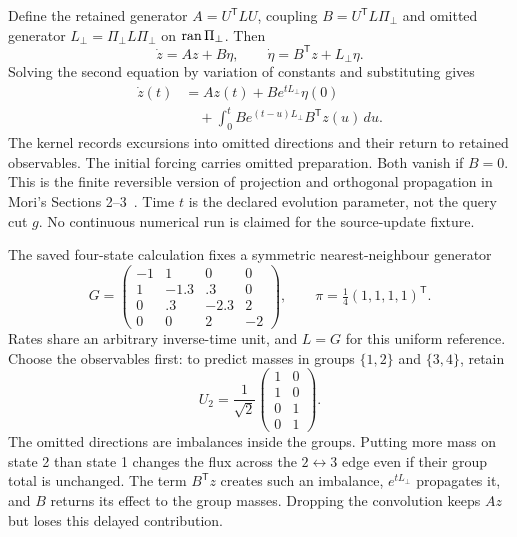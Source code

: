 Define the retained generator \(A=U^{\mathsf T}LU\), coupling \(B=U^{\mathsf T}L\Pi_\perp\) and omitted generator
\(L_\perp=\Pi_\perp L\Pi_\perp\) on \(\operatorname{ran}\Pi_\perp\).
Then
\begin{equation}
 \dot z=Az+B\eta,\qquad
 \dot\eta=B^{\mathsf T}z+L_\perp\eta .
\end{equation}
Solving the second equation by variation of constants and substituting gives
\begin{align}
 \dot z(t)&=Az(t)+B e^{tL_\perp}\eta(0)\nonumber\\
 &\quad+\int_0^t B e^{(t-u)L_\perp}B^{\mathsf T}z(u)\,du .
 \label{eq:dm-memory}
\end{align}
The kernel records excursions into omitted directions and their return to retained observables.
The initial forcing carries omitted preparation.
Both vanish if \(B=0\).
This is the finite reversible version of projection and orthogonal propagation in Mori's Sections 2--3~\cite{mori}.
Time \(t\) is the declared evolution parameter, not the query cut \(g\).
No continuous numerical run is claimed for the source-update fixture.

The saved four-state calculation fixes a symmetric nearest-neighbour generator
\begin{equation}
G=\begin{pmatrix}
-1&1&0&0\\
1&-1.3&.3&0\\
0&.3&-2.3&2\\
0&0&2&-2
\end{pmatrix},\qquad
\pi=\tfrac14(1,1,1,1)^{\mathsf T}.
\end{equation}
Rates share an arbitrary inverse-time unit, and \(L=G\) for this uniform reference.
Choose the observables first: to predict masses in groups \(\{1,2\}\) and \(\{3,4\}\), retain
\begin{equation}
U_2=\frac1{\sqrt2}
\begin{pmatrix}1&0\\1&0\\0&1\\0&1\end{pmatrix}.
\end{equation}
The omitted directions are imbalances inside the groups.
Putting more mass on state 2 than state 1 changes the flux across the \(2\leftrightarrow3\) edge even if their group total is unchanged.
The term \(B^{\mathsf T}z\) creates such an imbalance, \(e^{tL_\perp}\) propagates it, and \(B\) returns its effect to the group masses.
Dropping the convolution keeps \(Az\) but loses this delayed contribution.


